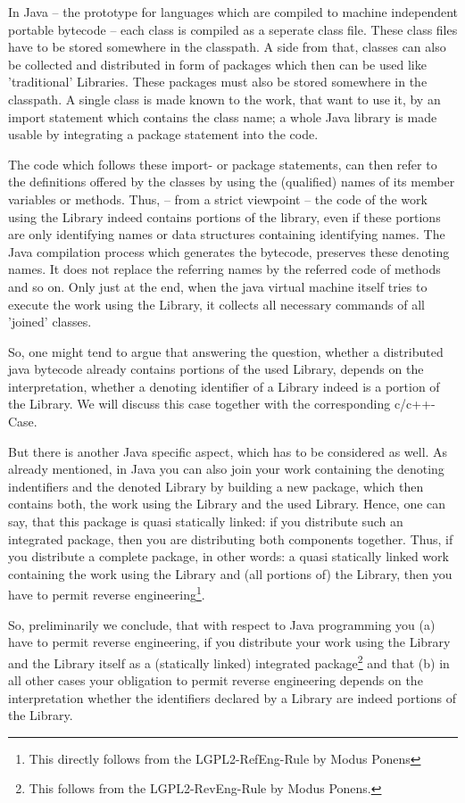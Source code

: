 In Java -- the prototype for languages which are compiled to machine independent
portable bytecode -- each class is compiled as a seperate class file. These
class files have to be stored somewhere in the classpath. A side from that,
classes can also be collected and distributed in form of packages which then can
be used like 'traditional' Libraries. These packages must also be stored
somewhere in the classpath. A single class is made known to the work, that want
to use it, by an import statement which contains the class name; a whole Java
library is made usable by integrating a package statement into the code.

The code which follows these import- or package statements, can then refer to
the definitions offered by the classes by using the (qualified) names of its
member variables or methods. Thus, -- from a strict viewpoint -- the code of the
work using the Library indeed contains portions of the library, even if these
portions are only identifying names or data structures containing identifying
names. The Java compilation process which generates the bytecode, preserves
these denoting names. It does not replace the referring names by the referred
code of methods and so on. Only just at the end, when the java virtual machine
itself tries to execute the work using the Library, it collects all necessary
commands of all 'joined' classes.

So, one might tend to argue that answering the question, whether a distributed
java bytecode already contains portions of the used Library, depends on the
interpretation, whether a denoting identifier of a Library indeed is a portion
of the Library. We will discuss this case together with the corresponding
c/c++-Case. 

But there is another Java specific aspect, which has to be considered as well.
As already mentioned, in Java you can also join your work containing the
denoting indentifiers and the denoted Library by building a new package, which
then contains both, the work using the Library and the used Library. Hence, one
can say, that this package is quasi statically linked: if you distribute such an
integrated package, then you are distributing both components together. Thus, if
you distribute a complete package, in other words: a quasi statically linked
work containing the work using the Library and (all portions of) the Library,
then you have to permit reverse engineering\footnote{This directly follows from
the LGPL2-RefEng-Rule by Modus Ponens}.

So, preliminarily we conclude, that with respect to Java programming you (a)
have to permit reverse engineering, if you distribute your work using the
Library and the Library itself as a (statically linked) integrated
package\footnote{This follows from the LGPL2-RevEng-Rule by Modus Ponens.} and
that (b) in all other cases your obligation to permit reverse engineering
depends on the interpretation whether the identifiers declared by a Library are
indeed portions of the Library.

